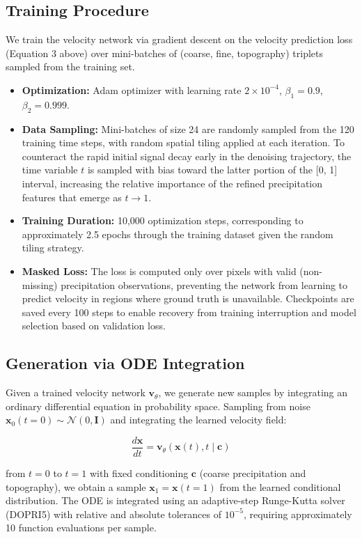 \documentclass[12pt]{article}
\begin{document}


\subsection{Training Procedure}
    
    We train the velocity network via gradient descent on the velocity prediction loss (Equation 3 above) over mini-batches of (coarse, fine, topography) triplets sampled from the training set. 

\begin{itemize}
    
\item \textbf{Optimization:} Adam optimizer with learning rate $2 \times 10^{-4}$, $\beta_1 = 0.9$, $\beta_2 = 0.999$.
    

\item \textbf{Data Sampling:} Mini-batches of size 24 are randomly sampled from the 120 training time steps, with random spatial tiling applied at each iteration. To counteract the rapid initial signal decay early in the denoising trajectory, the time variable $t$ is sampled with bias toward the latter portion of the [0, 1] interval, increasing the relative importance of the refined precipitation features that emerge as $t \to 1$.
    
\item \textbf{Training Duration:} 10,000 optimization steps, corresponding to approximately 2.5 epochs through the training dataset given the random tiling strategy.
    

\item \textbf{Masked Loss:} The loss is computed only over pixels with valid (non-missing) precipitation observations, preventing the network from learning to predict velocity in regions where ground truth is unavailable. Checkpoints are saved every 100 steps to enable recovery from training interruption and model selection based on validation loss.
    
\end{itemize}


\subsection{Generation via ODE Integration}
    
Given a trained velocity network $\mathbf{v}_\theta$, we generate new samples by integrating an ordinary differential equation in probability space. Sampling from noise $\mathbf{x}_0(t=0) \sim \mathcal{N}(0, \mathbf{I})$ and integrating the learned velocity field:

    $$\frac{d\mathbf{x}}{dt} = \mathbf{v}_\theta(\mathbf{x}(t), t \mid \mathbf{c})$$

\noindent from $t=0$ to $t=1$ with fixed conditioning $\mathbf{c}$ (coarse precipitation and topography), we obtain a sample $\mathbf{x}_1 = \mathbf{x}(t=1)$ from the learned conditional distribution. The ODE is integrated using an adaptive-step Runge-Kutta solver (DOPRI5) with relative and absolute tolerances of $10^{-5}$, requiring approximately 10 function evaluations per sample.


\end{document}
